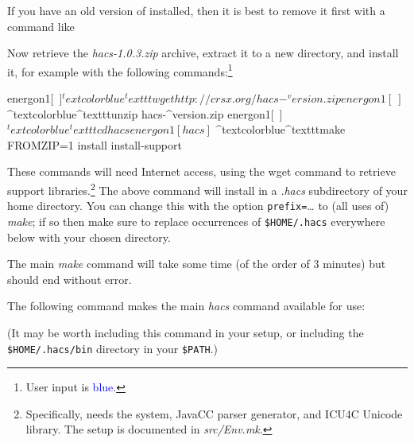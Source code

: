 \documentclass[11pt]{article} %
\def\version{1.0.3\xspace}
\begin{document}
\begin{commands}\label{com:all}
  If you have an old version of \HAX installed, then it is best to remove it first with a command like
  Now retrieve the \emph{hacs-\version.zip} archive, extract it to a new directory, and install it, for
  example with the following commands:\footnote{User input is \textcolor{blue}{blue}.}
\begin{code}[commandchars=\^\{\}]
energon1[~]$ ^textcolor{blue}{^texttt{wget http://crsx.org/hacs-^version.zip}}
energon1[~]$ ^textcolor{blue}{^texttt{unzip hacs-^version.zip}}
energon1[~]$ ^textcolor{blue}{^texttt{cd hacs}}
energon1[hacs]$ ^textcolor{blue}{^texttt{make FROMZIP=1 install install-support}}
\end{code}



  These commands will need Internet access, using the wget command to retrieve support
  libraries.\footnote{Specifically, \HAX needs the \CRSX system, JavaCC parser generator, and ICU4C
    Unicode library. The setup is documented in \emph{src/Env.mk}.} The above command will install
  \HAX in a \emph{.hacs} subdirectory of your home directory. You can change this with the option
  \verb|prefix=|…  to (all uses of) \emph{make}; if so then make sure to replace occurrences of
  \verb|$HOME/.hacs| everywhere below with your chosen directory.

  The main \emph{make} command will take some time (of the order of 3 minutes) but should end
  without error.

  The following command makes the main \emph{hacs} command available for use:
  (It may be worth including this command in your setup, or including the \verb|$HOME/.hacs/bin|
  directory in your \verb|$PATH|.)


\end{commands}
\end{document}
